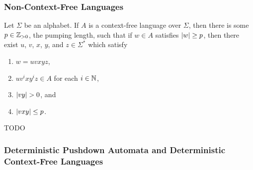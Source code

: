 \subsubsection{Non-Context-Free Languages}

  Let \(\Sigma\) be an alphabet. If \(A\) is a context-free language over \(\Sigma\), then there is some
  \(p \in \mathbb{Z}_{>0}\), the pumping length, such that if \(w \in A\) satisfies \(\lvert w\rvert \geq p\), then there exist \(u\),
  \(v\), \(x\), \(y\), and \(z \in \Sigma^*\) which satisfy
  \begin{enumerate}
    \item \(w = u v x y z\),
    \item \(u v^i x y^i z \in A\) for each \(i \in \mathbb{N}\),
    \item \(\lvert v y\rvert > 0\), and
    \item \(\lvert v x y\rvert \leq p\).
  \end{enumerate}
\Eth
\Bpr
  TODO
\Epr

\subsubsection{Deterministic Pushdown Automata and Deterministic Context-Free Languages}

\Edc

